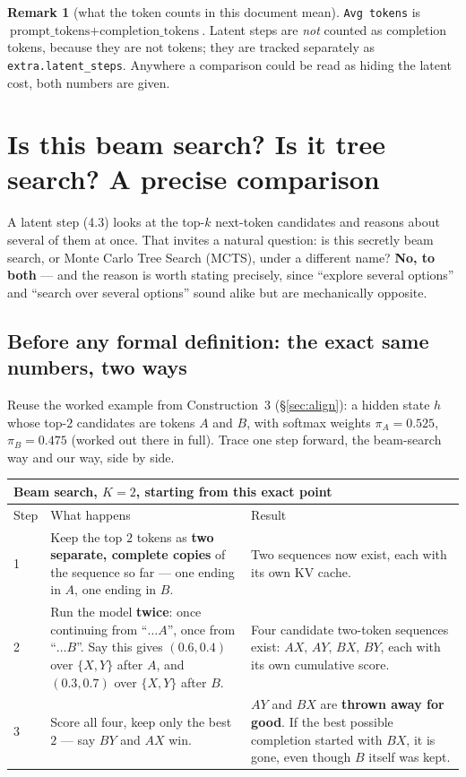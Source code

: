 \documentclass[11pt]{article}
\theoremstyle{definition}
\newtheorem{remark}[theorem]{Remark}
\begin{document}
\begin{remark}[what the token counts in this document mean]
\texttt{Avg tokens} is $\text{prompt\_tokens} + \text{completion\_tokens}$. Latent steps are \emph{not} counted as completion tokens, because they are not tokens; they are tracked separately as \texttt{extra.latent\_steps}. Anywhere a comparison could be read as hiding the latent cost, both numbers are given.
\end{remark}

\section{Is this beam search? Is it tree search? A precise comparison}
\label{sec:not-search}

A latent step (4.3) looks at the top-$k$ next-token candidates and reasons about several of them at once. That invites a natural question: is this secretly beam search, or Monte Carlo Tree Search (MCTS), under a different name? \textbf{No, to both} --- and the reason is worth stating precisely, since ``explore several options'' and ``search over several options'' sound alike but are mechanically opposite.

\subsection{Before any formal definition: the exact same numbers, two ways}

Reuse the worked example from Construction~3 (\S\ref{sec:align}): a hidden state $h$ whose top-$2$ candidates are tokens $A$ and $B$, with softmax weights $\pi_A=0.525$, $\pi_B=0.475$ (worked out there in full). Trace one step forward, the beam-search way and our way, side by side.

\begin{center}
\small
\begin{tabular}{@{}p{}p{}p{}@{}}
\toprule
\multicolumn{3}{l}{\textbf{Beam search, $K=2$, starting from this exact point}} \\
\midrule
Step & What happens & Result \\
\midrule
1 & Keep the top $2$ tokens as \textbf{two separate, complete copies} of the
  sequence so far --- one ending in $A$, one ending in $B$. &
  Two sequences now exist, each with its own KV cache. \\
2 & Run the model \textbf{twice}: once continuing from ``$\ldots A$'', once
  from ``$\ldots B$''. Say this gives $(0.6, 0.4)$ over $\{X,Y\}$ after $A$,
  and $(0.3, 0.7)$ over $\{X,Y\}$ after $B$. &
  Four candidate two-token sequences exist: $AX,\,AY,\,BX,\,BY$, each with its
  own cumulative score. \\
3 & Score all four, keep only the best $2$ --- say $BY$ and $AX$ win. &
  $AY$ and $BX$ are \textbf{thrown away for good}. If the best possible
  completion started with $BX$, it is gone, even though $B$ itself was kept. \\
\bottomrule
\end{tabular}
\end{center}
\end{document}
